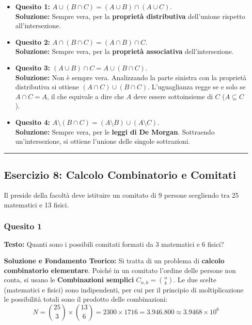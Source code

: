 \documentclass[12pt, a4paper]{article}
\begin{document}
\begin{itemize}
    \item \textbf{Quesito 1:} $A \cup (B \cap C) = (A \cup B) \cap (A \cup C)$. \\ \textbf{Soluzione:} Sempre vera, per la \textbf{proprietà distributiva} dell'unione rispetto all'intersezione.
    \item \textbf{Quesito 2:} $A \cap (B \cap C) = (A \cap B) \cap C$. \\ \textbf{Soluzione:} Sempre vera, per la \textbf{proprietà associativa} dell'intersezione.
    \item \textbf{Quesito 3:} $(A \cup B) \cap C = A \cup (B \cap C)$. \\ \textbf{Soluzione:} Non è sempre vera. Analizzando la parte sinistra con la proprietà distributiva si ottiene $(A \cap C) \cup (B \cap C)$. L'uguaglianza regge se e solo se $A \cap C = A$, il che equivale a dire che $A$ deve essere sottoinsieme di $C$ ($A \subseteq C$).
    \item \textbf{Quesito 4:} $A \setminus (B \cap C) = (A \setminus B) \cup (A \setminus C)$. \\ \textbf{Soluzione:} Sempre vera, per le \textbf{leggi di De Morgan}. Sottraendo un'intersezione, si ottiene l'unione delle singole sottrazioni.
\end{itemize}

\vspace{0.5cm}\hrule\vspace{0.5cm}

\subsection*{Esercizio 8: Calcolo Combinatorio e Comitati}
Il preside della facoltà deve istituire un comitato di 9 persone scegliendo tra 25 matematici e 13 fisici.

\subsubsection*{Quesito 1}
\textbf{Testo:} Quanti sono i possibili comitati formati da 3 matematici e 6 fisici?

\textbf{Soluzione e Fondamento Teorico:} 
Si tratta di un problema di \textbf{calcolo combinatorio elementare}. Poiché in un comitato l'ordine delle persone non conta, si usano le \textbf{Combinazioni semplici} $C_{n,k} = \binom{n}{k}$. 
Le due scelte (matematici e fisici) sono indipendenti, per cui per il principio di moltiplicazione le possibilità totali sono il prodotto delle combinazioni:
$$ N = \binom{25}{3} \times \binom{13}{6} = 2300 \times 1716 = 3.946.800 \approx 3.9468 \times 10^6 $$
\end{document}
